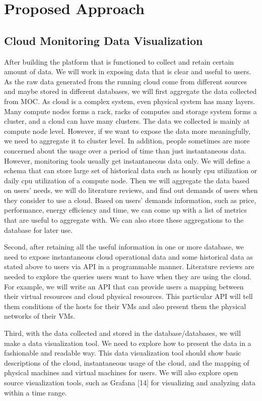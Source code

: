 \section{Proposed Approach}
\label{sec:ProposedApproach}



\subsection{Cloud Monitoring Data Visualization}
  
  After building the platform that is functioned to collect and retain certain amount of data. We will work in exposing data that is clear and useful to users. As the raw data generated from the running cloud come from different sources and maybe stored in different databases, we will first aggregate the data collected from MOC. As cloud is a complex system, even physical system has many layers. Many compute nodes forms a rack, racks of computes and storage system forms a cluster, and a cloud can have many clusters. The data we collected is mainly at compute node level. However, if we want to expose the data more meaningfully, we need to aggregate it to cluster level. In addition, people sometimes are more concerned about the usage over a period of time than just instantaneous data. However, monitoring tools usually get instantaneous data only. We will define a schema that can store large set of historical data such as hourly cpu utilization or daily cpu utilization of a compute node. Then we will aggregate the data based on users' needs, we will do literature reviews, and find out demands of users when they consider to use a cloud. Based on users' demands information, such as price, performance, energy efficiency and time, we can come up with a list of metrics that are useful to aggregate with. We can also store these aggregations to the database for later use.
  
  Second, after retaining all the useful information in one or more database, we need to expose instantaneous cloud operational data  and some historical data as stated above to users via API in a programmable manner. Literature reviews are needed to explore the queries users want to have when they are using the cloud. For example, we will write an API that can provide users a mapping between their virtual resources and cloud physical resources. This particular API will tell them conditions of  the hosts for their VMs and also present them the physical networks of their VMs. 
  
  Third, with the data collected and stored in the database/databases, we will make a data visualization tool. We need to explore how to present the data in a fashionable and readable way. This data visualization tool should show basic descriptions of the cloud, instantaneous usage of the cloud, and the mapping of physical machines and virtual machines for users. We will also explore open source visualization tools, such as Grafana [14] for visualizing and analyzing data within a time range.



